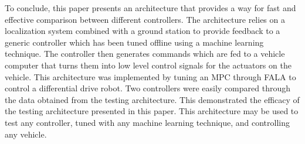 \documentclass[conference]{IEEEtran}
\begin{document}
To conclude, this paper presents an architecture that provides a way for fast and effective comparison between different controllers. The architecture relies on a localization system combined with a ground station to provide feedback to a generic controller which has been tuned offline using a machine learning technique. The controller then generates commands which are fed to a vehicle computer that turns them into low level control signals for the actuators on the vehicle. This architecture was implemented by tuning an MPC through FALA to control a differential drive robot. Two controllers were easily compared through the data obtained from the testing architecture. This demonstrated the efficacy of the testing architecture presented in this paper. This architecture may be used to test any controller, tuned with any machine learning technique, and controlling any vehicle.

\balance










%
%
%




\end{document}
